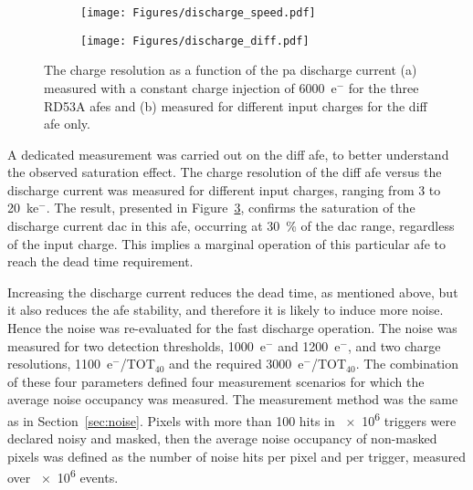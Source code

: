 \begin{figure}[ht]
    \centering
    \begin{subfigure}{0.49\textwidth}
        \texttt{[image: Figures/discharge\_speed.pdf]}
        \caption{}
        \label{fig:dt}
    \end{subfigure}
    \hfill
    \begin{subfigure}{0.49\textwidth}
        \texttt{[image: Figures/discharge\_diff.pdf]}
        \caption{}
        \label{fig:dtdiff}
    \end{subfigure}  
    \caption{The charge resolution as a function of the \gls{pa} discharge current (a) measured with a constant charge injection of \num{6000}~e${^{-}}$ for the three RD53A \glspl{afe} and (b) measured for different input charges for the \gls{diff} \gls{afe} only.}
\end{figure}

A dedicated measurement was carried out on the \gls{diff} \gls{afe}, to better understand the observed saturation effect.
The charge resolution of the \gls{diff} \gls{afe} versus the discharge current was measured for different input charges, ranging from \num{3} to \num{20}~ke$^{-}$. The result, presented in Figure~\ref{fig:dtdiff}, confirms the saturation of the discharge current \gls{dac} in this \gls{afe}, occurring at \SI{30}{\percent} of the \gls{dac} range, regardless of the input charge. This implies a marginal operation of this particular \gls{afe} to reach the dead time requirement.

Increasing the discharge current reduces the dead time, as mentioned above, but it also reduces the \gls{afe} stability, and therefore it is likely to induce more noise. Hence the noise was re-evaluated for the fast discharge operation.
The noise was measured for two detection thresholds, \num{1000}~e${^{-}}$ and \num{1200}~e${^{-}}$, and two charge resolutions, \num{1100}~e${^{-}}$/TOT$_{40}$ and the required \num{3000}~e${^{-}}$/TOT$_{40}$.
The combination of these four parameters defined four measurement scenarios for which the average noise occupancy was measured. The measurement method was the same as in Section~\ref{sec:noise}. Pixels with more than \num{100} hits in \num{e6} triggers were declared noisy and masked, then the average noise occupancy of non-masked pixels was defined as the number of noise hits per pixel and per trigger, measured over \num{e6} events.

